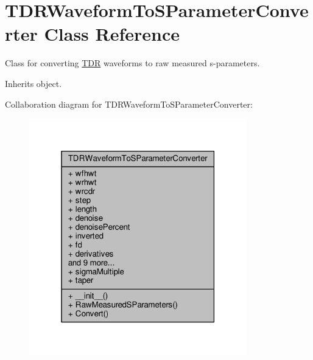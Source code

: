 \hypertarget{classSignalIntegrity_1_1Measurement_1_1TDR_1_1TDRWaveformToSParameterConverter_1_1TDRWaveformToSParameterConverter}{}\section{T\+D\+R\+Waveform\+To\+S\+Parameter\+Converter Class Reference}
\label{classSignalIntegrity_1_1Measurement_1_1TDR_1_1TDRWaveformToSParameterConverter_1_1TDRWaveformToSParameterConverter}


Class for converting \hyperlink{namespaceSignalIntegrity_1_1Measurement_1_1TDR}{T\+DR} waveforms to raw measured s-\/parameters.  




Inherits object.



Collaboration diagram for T\+D\+R\+Waveform\+To\+S\+Parameter\+Converter\+:
\nopagebreak
\begin{figure}[H]
\begin{center}
\leavevmode
\includegraphics[width=268pt]{classSignalIntegrity_1_1Measurement_1_1TDR_1_1TDRWaveformToSParameterConverter_1_1TDRWaveformToSParameterConverter__coll__graph}
\end{center}
\end{figure}
